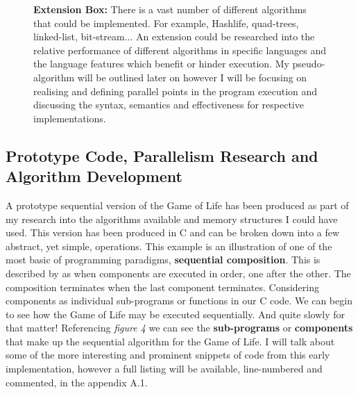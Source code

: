 \documentclass[11pt]{article} %
\begin{document}
\begin{figure}
\begin{mdframed}
{\bf Extension Box:} There is a vast number of different algorithms that could be implemented. For example, Hashlife, quad-trees, linked-list, bit-stream... An extension could be researched into the relative performance of different algorithms in specific languages and the language features which benefit or hinder execution. My pseudo-algorithm will be outlined later on however I will be focusing on realising and defining parallel points in the program execution and discussing the syntax, semantics and effectiveness for respective implementations.
\end{mdframed} 
\end{figure} 
\subsection{Prototype Code, Parallelism Research and Algorithm Development}
A prototype sequential version of the Game of Life has been produced as part of my research into the algorithms available and memory structures I could have used. This version has been produced in C and can be broken down into a few abstract, yet simple, operations. This example is an illustration of one of the most basic of programming paradigms, {\bf sequential composition}. This is described by \cite[Chandry and Taylor, p68]{ref9} as when components are executed in order, one after the other. The composition terminates when the last component terminates. Considering components as individual sub-programs or functions in our C code. We can begin to see how the Game of Life may be executed sequentially. And quite slowly for that matter! Referencing {\it figure 4} we can see the {\bf sub-programs} or {\bf components} that make up the sequential algorithm for the Game of Life. I will talk about some of the more interesting and prominent snippets of code from this early implementation, however a full listing will be available, line-numbered and commented, in the appendix A.1.\\
\end{document}

